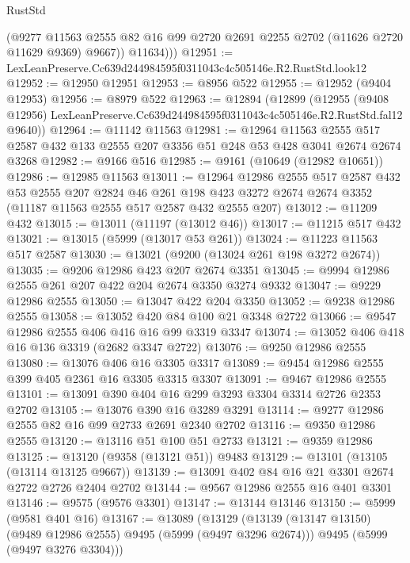 \begin{lexlean}{RustStd}
\begin{coremodule}
            (@9277
              @11563
              @2555
              @82
              @16
              @99
              @2720
              @2691
              @2255
              @2702
              (@11626 @2720 @11629 @9369)
              @9667))
          @11634)))
@12951 := LexLeanPreserve.Cc639d244984595f0311043c4c505146e.R2.RustStd.look12
@12952 := @12950 @12951
@12953 := @8956 @522
@12955 := @12952 (@9404 @12953)
@12956 := @8979 @522
@12963 := @12894
    (@12899
      (@12955
        (@9408 @12956)
        LexLeanPreserve.Cc639d244984595f0311043c4c505146e.R2.RustStd.fal12
        @9640))
@12964 := @11142 @11563
@12981 := @12964
    @11563
    @2555
    @517
    @2587
    @432
    @133
    @2555
    @207
    @3356
    @51
    @248
    @53
    @428
    @3041
    @2674
    @2674
    @3268
@12982 := @9166 @516
@12985 := @9161 (@10649 (@12982 @10651))
@12986 := @12985 @11563
@13011 := @12964
    @12986
    @2555
    @517
    @2587
    @432
    @53
    @2555
    @207
    @2824
    @46
    @261
    @198
    @423
    @3272
    @2674
    @2674
    @3352
    (@11187 @11563 @2555 @517 @2587 @432 @2555 @207)
@13012 := @11209 @432
@13015 := @13011 (@11197 (@13012 @46))
@13017 := @11215 @517 @432
@13021 := @13015 (@5999 (@13017 @53 @261))
@13024 := @11223 @11563 @517 @2587
@13030 := @13021 (@9200 (@13024 @261 @198 @3272 @2674))
@13035 := @9206 @12986 @423 @207 @2674 @3351
@13045 := @9994 @12986 @2555 @261 @207 @422 @204 @2674 @3350 @3274 @9332
@13047 := @9229 @12986 @2555
@13050 := @13047 @422 @204 @3350
@13052 := @9238 @12986 @2555
@13058 := @13052 @420 @84 @100 @21 @3348 @2722
@13066 := @9547 @12986 @2555 @406 @416 @16 @99 @3319 @3347
@13074 := @13052 @406 @418 @16 @136 @3319 (@2682 @3347 @2722)
@13076 := @9250 @12986 @2555
@13080 := @13076 @406 @16 @3305 @3317
@13089 := @9454 @12986 @2555 @399 @405 @2361 @16 @3305 @3315 @3307
@13091 := @9467 @12986 @2555
@13101 := @13091 @390 @404 @16 @299 @3293 @3304 @3314 @2726 @2353 @2702
@13105 := @13076 @390 @16 @3289 @3291
@13114 := @9277 @12986 @2555 @82 @16 @99 @2733 @2691 @2340 @2702
@13116 := @9350 @12986 @2555
@13120 := @13116 @51 @100 @51 @2733
@13121 := @9359 @12986
@13125 := @13120 (@9358 (@13121 @51)) @9483
@13129 := @13101 (@13105 (@13114 @13125 @9667))
@13139 := @13091 @402 @84 @16 @21 @3301 @2674 @2722 @2726 @2404 @2702
@13144 := @9567 @12986 @2555 @16 @401 @3301
@13146 := @9575 (@9576 @3301)
@13147 := @13144 @13146
@13150 := @5999 (@9581 @401 @16)
@13167 := @13089
    (@13129
      (@13139 (@13147 @13150) (@9489 @12986 @2555) @9495 (@5999 (@9497 @3296 @2674)))
      @9495
      (@5999 (@9497 @3276 @3304)))

\end{coremodule}
\end{lexlean}
